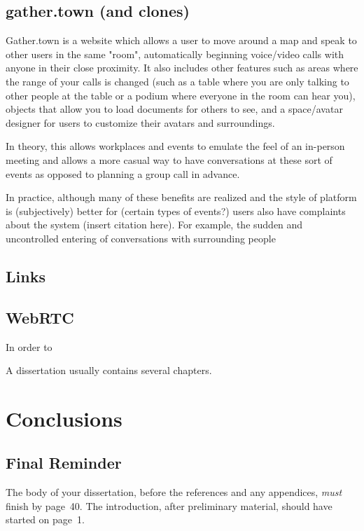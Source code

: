 \documentclass[bsc,frontabs,singlespacing,parskip,deptreport]{infthesis}
\begin{document}
\section{gather.town (and clones)}

Gather.town is a website which allows a user to move around a map and speak to other users
in the same "room", automatically beginning voice/video calls with anyone in their close proximity.
It also includes other features such as areas where the range of your calls is changed
(such as a table where you are only talking to other people at the table or a podium where everyone in the room can hear you),
objects that allow you to load documents for others to see, and a space/avatar designer for users to customize their avatars and surroundings.

 In theory, this allows workplaces and events to emulate the feel of an in-person meeting and allows
 a more casual way to have conversations at these sort of events as opposed to planning a group call in advance.

 In practice, although many of these benefits are realized and the style of platform is (subjectively) better for (certain types of events?)
 users also have complaints about the system (insert citation here).  For example, the sudden and uncontrolled entering of conversations with surrounding people

\section{Links}

\section{WebRTC}



In order to

A dissertation usually contains several chapters.

\chapter{Conclusions}

\section{Final Reminder}

The body of your dissertation, before the references and any appendices,
\emph{must} finish by page~40. The introduction, after preliminary material,
should have started on page~1.
\end{document}
